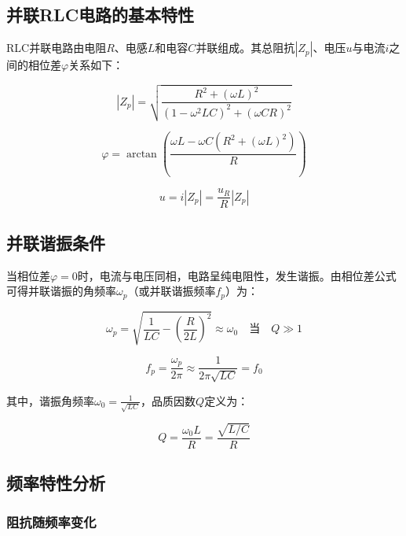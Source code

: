 \documentclass[a4paper,10pt]{article}
\begin{document}
\subsection{并联RLC电路的基本特性}

RLC并联电路由电阻\( R \)、电感\( L \)和电容\( C \)并联组成。其总阻抗\( |Z_p| \)、电压\( u \)与电流\( i \)之间的相位差\( \varphi \)关系如下：

\begin{equation}
|Z_p| = \sqrt{\frac{R^2 + (\omega L)^2}{(1 - \omega^2 LC)^2 + (\omega CR)^2}}
\end{equation}

\begin{equation}
\varphi = \arctan \left( \frac{\omega L - \omega C (R^2 + (\omega L)^2)}{R} \right)
\end{equation}

\begin{equation}
u = i |Z_p| = \frac{u_R}{R} |Z_p|
\end{equation}

\subsection{并联谐振条件}

当相位差\( \varphi = 0 \)时，电流与电压同相，电路呈纯电阻性，发生谐振。由相位差公式可得并联谐振的角频率\( \omega_p \)（或并联谐振频率\( f_p \)）为：

\begin{equation}
\omega_p = \sqrt{\frac{1}{LC} - \left(\frac{R}{2L}\right)^2} \approx \omega_0 \quad \text{当} \quad Q \gg 1
\end{equation}

\begin{equation}
f_p = \frac{\omega_p}{2\pi} \approx \frac{1}{2\pi\sqrt{LC}} = f_0
\end{equation}

其中，谐振角频率\( \omega_0 = \frac{1}{\sqrt{LC}} \)，品质因数\( Q \)定义为：

\begin{equation}
Q = \frac{\omega_0 L}{R} = \frac{\sqrt{L/C}}{R}
\end{equation}

\subsection{频率特性分析}

\subsubsection{阻抗随频率变化}
\end{document}
